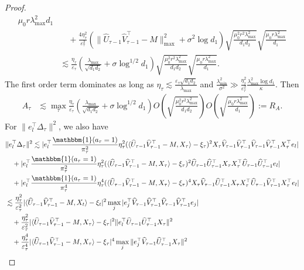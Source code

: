 \documentclass[12pt]{article}
\newcommand{\inp}[2]{\langle #1,#2\rangle}
\theoremstyle{plain}
\begin{document}
\begin{proof}
\begin{align*}
{    {\mu_0r\lambda_{\max}^2}{d_1}} \\ &\quad + \frac{4\eta_\tau^2}{\varepsilon_\tau^2}(\|\widehat{U}_{\tau-1}\widehat{V}_{\tau-1}^{\top} - M\|_{\max}^2+\sigma^2\log d_1)\sqrt{\frac{\mu_0^2r^2\lambda_{\max}^2}{d_1d_2}}\sqrt{\frac
    {\mu_0r\lambda_{\max}^2}{d_1}} \\
    &\lesssim \frac{\eta_\tau}{\varepsilon_\tau}(\frac{\lambda_{\max}}{\sqrt{d_1d_2}}+\sigma\log^{1/2}d_1)\sqrt{\frac{\mu_0^2r^2\lambda_{\max}^2}{d_1d_2}}\sqrt{\frac
    {\mu_0r\lambda_{\max}^2}{d_1}}.
\end{align*}
The first order term dominates as long as $\eta_\tau\lesssim \frac{\varepsilon_\tau\sqrt{d_1d_2}}{\lambda_{\max}}$ and $\frac{\lambda_{\min}^2}{\sigma^2}\gg \frac{\eta_\tau^2}{\varepsilon_\tau^2} \frac{\lambda_{\max}^2\log d_1}{\kappa}$. Then
\begin{align*}
    A_{\tau}&\lesssim \max_{\tau}\frac{\eta_{\tau}}{\varepsilon_{\tau}}(\frac{\lambda_{\max}}{\sqrt{d_1d_2}}+\sigma\log^{1/2}d_1)O(\sqrt{\frac{\mu_0^2r^2\lambda_{\max}^2}{d_1d_2}})O(\sqrt{\frac
    {\mu_0r\lambda_{\max}^2}{d_1}}):=R_A.
\end{align*}
For $\|e_l^{\top}\Delta_{\tau}\|^2$, we also have
\begin{align*}
    &\|e_l^{\top}\Delta_{\tau}\|^2\lesssim |e_l^{\top} \frac{\mathbbm{1}(a_\tau=1)}{\pi_\tau^2}\eta_\tau^2(\inp{\widehat{U}_{\tau-1}\widehat{V}_{\tau-1}^{\top} - M}{X_\tau}-\xi_\tau)^2X_\tau\widehat{V}_{\tau-1}\widehat{V}_{\tau-1}^{\top}\widehat{V}_{\tau-1}\widehat{V}_{\tau-1}^{\top}X_\tau^{\top} e_l| \\ &\quad + |e_l^{\top} \frac{\mathbbm{1}(a_\tau=1)}{\pi_\tau^2}\eta_\tau^2(\inp{\widehat{U}_{\tau-1}\widehat{V}_{\tau-1}^{\top}- M}{X_\tau}-\xi_\tau)^2\widehat{U}_{\tau-1}\widehat{U}_{\tau-1}^{\top}X_\tau X_\tau^{\top}\widehat{U}_{\tau-1}\widehat{U}_{\tau-1}^{\top} e_l| \\ &\quad + |e_l^{\top} \frac{\mathbbm{1}(a_\tau=1)}{\pi_\tau^4}\eta_\tau^4(\inp{\widehat{U}_{\tau-1}\widehat{V}_{\tau-1}^{\top}- M}{X_\tau}-\xi_\tau)^4X_\tau \widehat{V}_{\tau-1}\widehat{U}_{\tau-1}^{\top}X_\tau X_\tau^{\top}\widehat{U}_{\tau-1}\widehat{V}_{\tau-1}^{\top}X_\tau^{\top}  e_l| \\
    &\lesssim \frac{\eta_\tau^2}{\varepsilon_\tau^2}|\inp{\widehat{U}_{\tau-1}\widehat{V}_{\tau-1}^{\top} - M}{X_t}-\xi_t|^2\max_j|e_j^{\top}\widehat{V}_{\tau-1}\widehat{V}_{\tau-1}^{\top}\widehat{V}_{\tau-1}\widehat{V}_{\tau-1}^{\top}e_j| \\ &\quad + \frac{\eta_\tau^2}{\varepsilon_\tau^2}|\inp{\widehat{U}_{\tau-1}\widehat{V}_{\tau-1}^{\top} - M}{X_\tau}-\xi_\tau|^2\|e_l^{\top}\widehat{U}_{\tau-1}\widehat{U}_{\tau-1}^{\top}X_\tau\|^2 \\ &\quad + \frac{\eta_\tau^4}{\varepsilon_\tau^4}|\inp{\widehat{U}_{\tau-1}\widehat{V}_{\tau-1}^{\top} - M}{X_\tau}-\xi_\tau|^4\max_j\|e_j^{\top}\widehat{V}_{\tau-1}\widehat{U}_{\tau-1}^{\top}X_\tau\|^2\\

\end{align*}
\end{proof}
\end{document}

